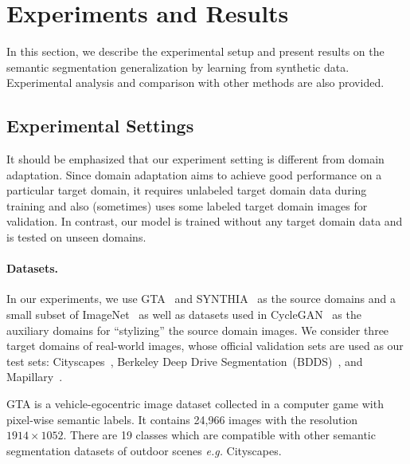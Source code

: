 \documentclass[10pt,twocolumn,letterpaper]{article}
\newcommand{\eat}[1]{}
\begin{document}
\eat{
we can get the $L_{dist}$ for the pyramid consistency between random crops and full images:
\begin{align}
L_{dist}\Big(\widehat{g_l}(I_0,\cdots,I_K;\theta),\, g_l(I_n^k;\theta)\Big) = L_{dist}\Big(\Bar{P}_n^{l,k}, PC_n^{l,k}\Big)

\end{align}
}


\section{Experiments and Results}
\label{sec:experiments_and_results}
In this section, we describe the experimental setup and present  results on the semantic
segmentation generalization by learning from
synthetic data. Experimental analysis and comparison with
other methods are also provided.

\subsection{Experimental Settings}
It should be emphasized that our experiment setting is different from domain adaptation. Since domain adaptation aims to achieve good performance on a particular target domain, it requires unlabeled target domain data during training and also (sometimes) uses some labeled target domain images for validation. In contrast, our model is trained without any target domain data and is tested on unseen domains. 
\vspace{-8mm}
\paragraph{Datasets.}
In our experiments, we use GTA~\cite{richter2016playingfordata} and SYNTHIA~\cite{ros2016synthia} as the source domains and a small subset of ImageNet~\cite{deng2009imagenet} as well as datasets used in CycleGAN~\cite{CycleGAN2017} as the auxiliary domains for ``stylizing'' the source domain images. We consider three target domains of real-world images, whose official validation sets are used as our test sets:  Cityscapes~\cite{cordts2016cityscapes}, Berkeley Deep Drive Segmentation~(BDDS)~\cite{yu2018bdd100k}, and Mapillary~\cite{neuhold2017mapillary}.

GTA is a vehicle-egocentric image dataset collected in a computer game with pixel-wise semantic labels. It contains 24,966 images with the resolution $1914\times1052$. There are 19 classes which are compatible with other semantic segmentation datasets of outdoor scenes \textit{e.g.} Cityscapes. 
\end{document}
